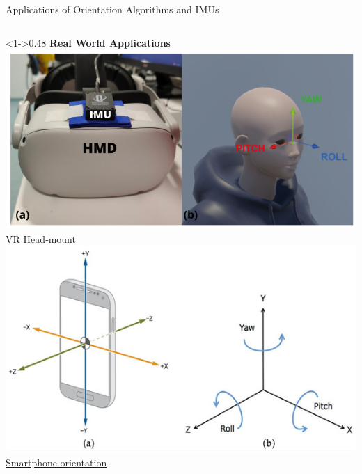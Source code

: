 \documentclass[aspectratio=169,xcolor=dvipsnames]{beamer}
\begin{document}
\begin{frame}{Applications of Orientation Algorithms and IMUs}
\tiny
\begin{columns}[T, totalwidth=\textwidth]

  \begin{column}<1->{0.48\textwidth}
    \centering
    \textbf{Real World Applications} \\[0.5em]

    \includegraphics[height=0.2\textheight]{logos/a-Inertial-measurement-unit-IMU-placed-over-the-head-mounted-display-HMD-b.png}\\[0.2em]
    \href{https://www.mdpi.com/1424-8220/23/6/3077}{VR Head‐mount} \\[0.5em]

    \includegraphics[height=0.2\textheight]{logos/smartphone.jpg}\\[0.2em]
    \href{https://www.mdpi.com/1424-8220/24/15/4769}{Smartphone orientation} \\[0.5em]


\end{column}
\end{columns}
\end{frame}
\end{document}
